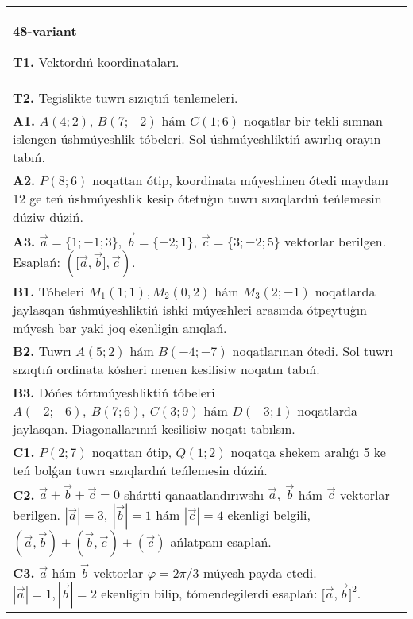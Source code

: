 \documentclass{article}
\begin{document}
\begin{tabular}{m{17cm}}
\textbf{48-variant}

\textbf{T1.} 
Vektordıń koordinataları.
 \\
\textbf{T2.} 
Tegislikte tuwrı sızıqtıń tenlemeleri.
 \\
\textbf{A1.} 
$A (4;2) $, $B (7;-2) $ hám $C (1;6) $ noqatlar bir tekli
sımnan islengen úshmúyeshlik tóbeleri. Sol úshmúyeshliktiń awırlıq orayın tabıń.
 \\
\textbf{A2.} 
$P (8;6) $ noqattan ótip, koordinata múyeshinen ótedi
maydanı 12 ge teń úshmúyeshlik kesip ótetuģın tuwrı sızıqlardıń teńlemesin dúziw
dúziń.
 \\
\textbf{A3.} 
$\overrightarrow{a}
= \{ 1; - 1;3\}, \ \overrightarrow{b} = \{ - 2;1\}$, $\overrightarrow{c} = \{3; -2;5\}$ vektorlar berilgen. Esaplań:
$ (\lbrack\overrightarrow{a},\overrightarrow{b}\rbrack,\overrightarrow{c}) $.
 \\
\textbf{B1.} 
Tóbeleri \(M_{1} (1;1), M_{2} (0,2) \) hám
\(M_{3} (2;-1) \) noqatlarda jaylasqan úshmúyeshliktiń ishki
múyeshleri arasında ótpeytuģın múyesh bar yaki joq ekenligin anıqlań.
 \\
\textbf{B2.} 
Tuwrı \(A (5;2) \) hám \(B (-4; -7) \) noqatlarınan ótedi.
Sol tuwrı sızıqtıń ordinata kósheri menen kesilisiw noqatın tabıń.
 \\
\textbf{B3.} 
Dóńes tórtmúyeshliktiń tóbeleri
\(A (-2;-6),\ B (7;6),\ C (3;9) \) hám \(D (-3;1) \) noqatlarda
jaylasqan. Diagonallarınıń kesilisiw noqatı tabılsın.
 \\
\textbf{C1.} 
\(P (2;7) \) noqattan ótip, \(Q (1;2) \) noqatqa shekem
aralıǵı 5 ke teń bolǵan tuwrı sızıqlardıń teńlemesin dúziń.
 \\
\textbf{C2.} 
$\vec{a} + \vec{b} + \vec{c} = 0$ shártti qanaatlandırıwshı $\vec{a},\ \vec{b}$ hám $\vec{c}$ vektorlar berilgen. $|\vec{a}| = 3,\ |\vec{b}| = 1$ hám $|\vec{c}| = 4$ ekenligi belgili, $\left(\vec{a},\vec{b} \right) + \left(\vec{b},\vec{c} \right) + (\vec{c}) $ ańlatpanı esaplań.
 \\
\textbf{C3.} 
$\vec{a}$ hám $\vec{b}$ vektorlar $\varphi = 2\pi/3$ múyesh payda etedi. $|\vec{a}| = 1,|\vec{b}| = 2$ ekenligin bilip, tómendegilerdi esaplań:
$\lbrack\vec{a},\vec{b}\rbrack^{2}$.
 \\

\end{tabular}
\vspace{1cm}
\end{document}
